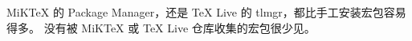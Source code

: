 \documentclass[UTF8]{ctexrep}
\begin{document}
\tableofcontents








 MiKTeX 的 Package Manager，还是 TeX Live 的 tlmgr，都比手工安装宏包容易得多。
没有被 MiKTeX 或 TeX Live 仓库收集的宏包很少见。

\end{document}
